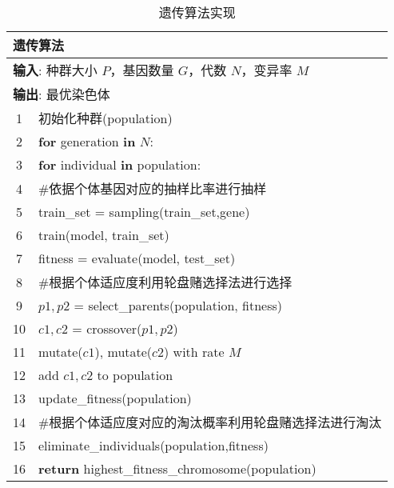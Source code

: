 \begin{table}[h]
	\caption{遗传算法实现}
	\label{tab:genetic_algorithm}
	\centering
	\begin{tabularx}{1.0\textwidth}{cl}
		\toprule
		\multicolumn{2}{l}{\textbf{遗传算法}}                                               \\
		\midrule
		\multicolumn{2}{l}{\textbf{输入}: 种群大小 $P$，基因数量 $G$，代数 $N$，变异率 $M$} \\
		\multicolumn{2}{l}{\textbf{输出}: 最优染色体}                                       \\
		1  & 初始化种群(population)                                                         \\
		2  & \textbf{for} generation \textbf{in} $N$:                                       \\
		3  & \quad \textbf{for} individual \textbf{in} population:                          \\
		4  & \quad\quad \#依据个体基因对应的抽样比率进行抽样                                \\
		5  & \quad\quad train\_set = sampling(train\_set,gene)                              \\
		6  & \quad\quad train(model, train\_set)                                            \\
		7  & \quad\quad fitness = evaluate(model, test\_set)                                \\
		8  & \quad \#根据个体适应度利用轮盘赌选择法进行选择                                 \\
		9  & \quad $p1, p2$ = select\_parents(population, fitness)                          \\
		10 & \quad $c1, c2$ = crossover($p1, p2$)                                           \\
		11 & \quad mutate($c1$), mutate($c2$) with rate $M$                                 \\
		12 & \quad add $c1, c2$ to population                                               \\
		13 & \quad update\_fitness(population)                                              \\
		14 & \quad \#根据个体适应度对应的淘汰概率利用轮盘赌选择法进行淘汰                   \\
		15 & \quad eliminate\_individuals(population,fitness)                               \\
		16 & \textbf{return} highest\_fitness\_chromosome(population)                       \\
		\bottomrule
	\end{tabularx}
\end{table}


